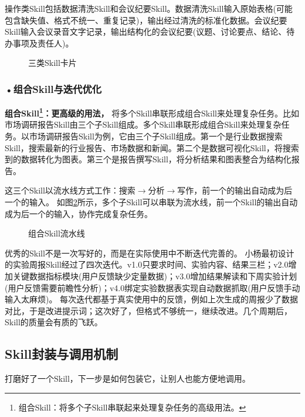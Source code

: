 操作类Skill包括数据清洗Skill和会议纪要Skill。数据清洗Skill输入原始表格(可能包含缺失值、格式不统一、重复记录)，输出经过清洗的标准化数据。会议纪要Skill输入会议录音文字记录，输出结构化的会议纪要(议题、讨论要点、结论、待办事项及责任人)。




\begin{figure}[H]
\centering
{}
\caption{三类Skill卡片}
\label{fig:ch3_3_16}
\end{figure}


\subsubsection*{\textbf{•组合Skill与迭代优化}}
\textbf{\textbf{组合Skill}\footnote{组合Skill：将多个子Skill串联起来处理复杂任务的高级用法。}：更高级的用法，}
将多个Skill串联形成组合Skill来处理复杂任务。比如市场调研报告Skill由三个子Skill组成。多个Skill串联形成组合Skill来处理复杂任务。以市场调研报告Skill为例，它由三个子Skill组成。第一个是行业数据搜索Skill，搜索最新的行业报告、市场数据和新闻。第二个是数据可视化Skill，将搜索到的数据转化为图表。第三个是报告撰写Skill，将分析结果和图表整合为结构化报告。

这三个Skill以流水线方式工作：搜索$\rightarrow$分析$\rightarrow$写作，前一个的输出自动成为后一个的输入。 如图\ref{fig:ch3_3_17}所示，多个子Skill可以串联为流水线，前一个Skill的输出自动成为后一个的输入，协作完成复杂任务。

\begin{figure}[H]
\centering
{}
\caption{组合Skill流水线}
\label{fig:ch3_3_17}
\end{figure}

优秀的Skill不是一次写好的，而是在实际使用中不断迭代完善的。
 小杨最初设计的实验周报Skill经过了四次迭代。v1.0只要求时间、实验内容、结果三栏；v2.0增加关键数据指标模块(用户反馈缺少定量数据)；v3.0增加结果解读和下周实验计划(用户反馈需要前瞻性分析)；v4.0绑定实验数据表实现自动数据抓取(用户反馈手动输入太麻烦)。
每次迭代都基于真实使用中的反馈，例如上次生成的周报少了数据对比，于是改进提示词；这次好了，但格式不够统一，继续改进。几个周期后，Skill的质量会有质的飞跃。

\subsection{Skill封装与调用机制}

打磨好了一个Skill，下一步是如何包装它，让别人也能方便地调用。

